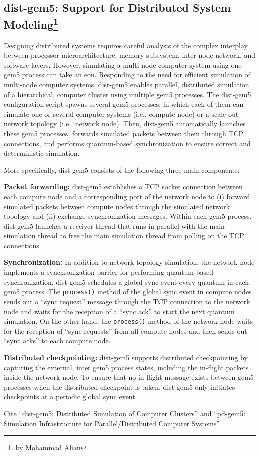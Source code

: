 \subsection[dist-gem5: Support for Distributed System Modeling]{dist-gem5: Support for Distributed System Modeling\footnote{by Mohammad Alian}}

Designing distributed systems requires careful analysis of the complex interplay between processor
microarchitecture, memory subsystem, inter-node network, and software layers.
However, simulating a multi-node computer system using one gem5 process can take an eon.
Responding to the need for efficient simulation of multi-node computer systems, dist-gem5 enables parallel, distributed simulation of a hierarchical, computer cluster using multiple gem5 processes.
The dist-gem5 configuration script spawns several gem5 processes, in which each of them can simulate one or several computer systems (i.e., compute node) or a scale-out network topology (i.e., network node).
Then, dist-gem5 automatically launches these gem5 processes, forwards simulated packets between them through TCP connections, and performs quantum-based synchronization to ensure correct and deterministic simulation.

More specifically, dist-gem5 consists of the following three main components:

\textbf{Packet forwarding:} dist-gem5 establishes a TCP socket connection between each compute node and a corresponding port of the network node to (i) forward simulated packets between compute nodes
through the simulated network topology and (ii) exchange synchronization messages.
Within each gem5 process, dist-gem5 launches a receiver thread that runs in parallel with the main simulation thread to free the main simulation thread from polling on the TCP connections.

\textbf{Synchronization:} In addition to network topology simulation, the network node implements a
synchronization barrier for performing quantum-based synchronization.
dist-gem5 schedules a global
sync event every quantum in each gem5 process.
The \verb|process()| method of the global sync event in
compute nodes sends out a ``sync request'' message through the TCP connection to the network node
and waits for the reception of a ``sync ack'' to start the next quantum simulation.
On the other hand, the \verb|process()| method of the network node waits for the reception of ``sync requests'' from all compute nodes and then sends out ``sync acks'' to each compute node.

\textbf{Distributed checkpointing:} dist-gem5 supports distributed checkpointing by capturing the external, inter gem5 process states, including the in-flight packets inside the network node.
To ensure that no in-flight message exists between gem5 processes when the distributed checkpoint is taken, dist-gem5 only initiates checkpoints at a periodic global sync event.

Cite ``dist-gem5: Distributed Simulation of Computer Clusters'' and ``pd-gem5: Simulation Infrastructure for Parallel/Distributed Computer Systems''
